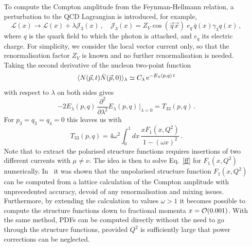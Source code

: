 To compute the Compton amplitude from the Feynman-Hellmann relation, 
a perturbation to the QCD Lagrangian is introduced, for example,
\begin{equation}
\mathcal{L}(x) \rightarrow \mathcal{L}(x) + \lambda \mathcal{J}_3(x)\,, 
\quad 
\mathcal{J}_3(x)=Z_V\cos(\vec{q}\vec{x})\; e_q \,\bar{q}(x)\gamma_3 q(x)\,, 
\label{in}
\end{equation}
where $q$ is the quark field to which the photon is attached, and $e_q$ its 
electric charge. 
%
For simplicity, we consider the local vector current only, so that the 
renormalisation factor $Z_V$ is known and no further renormalisation is needed. 
%
Taking the second derivative of the nucleon two-point function 
\begin{equation}
\langle N(\vec{p},t) 
\bar{N}(\vec{p},0)\rangle_\lambda \simeq C_\lambda\, {\rm e}^{-E_\lambda(p,q)\,t}
\end{equation}
with respect to $\lambda$ on both sides gives
\begin{equation}
-2 E_\lambda(p,q)\, 
\frac{\partial^2}{\partial\lambda^2}  E_\lambda(p,q)\,\big|_{\lambda=0} 
= T_{33}(p,q) \,.
\end{equation}
For $p_3=q_3=q_4=0$ this leaves us with
\begin{equation}
T_{33}(p,q) = 4 \omega^2 \int_0^1 dx\,  \frac{xF_1(x,Q^2)}{1-(\omega x)^2} \,.
\label{ff}
\end{equation}
Note that to extract the polarised structure functions requires insertions 
of two different currents with $\mu\neq \nu$. 
%
The idea is then to solve Eq.~\eqref{ff} for $F_1(x,Q^2)$ numerically.
%
In~\cite{Chambers:2017dov} it was shown that the unpolarised structure function 
$F_1(x,Q^2)$ can be computed from a lattice calculation of the Compton 
amplitude with unprecedented accuracy, devoid of any renormalisation 
and mixing issues. 
%
Furthermore, by extending the calculation to values $\omega > 1$ 
it becomes possible to compute the structure functions down to fractional 
momenta $x = {\cal O}(0.001)$. 
%
With the same method, PDFs can be computed directly without the need to go 
through the structure functions, provided $Q^2$ is sufficiently large 
that power corrections can be neglected. 


